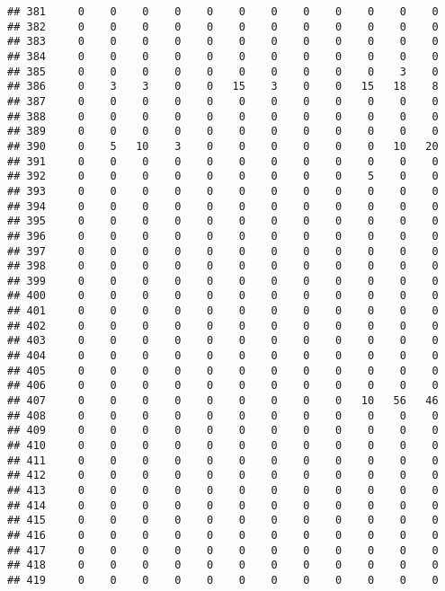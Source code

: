 \documentclass[]{article}
\begin{document}
\begin{verbatim}
## 381     0    0    0    0    0    0    0    0    0    0    0    0
## 382     0    0    0    0    0    0    0    0    0    0    0    0
## 383     0    0    0    0    0    0    0    0    0    0    0    0
## 384     0    0    0    0    0    0    0    0    0    0    0    0
## 385     0    0    0    0    0    0    0    0    0    0    3    0
## 386     0    3    3    0    0   15    3    0    0   15   18    8
## 387     0    0    0    0    0    0    0    0    0    0    0    0
## 388     0    0    0    0    0    0    0    0    0    0    0    0
## 389     0    0    0    0    0    0    0    0    0    0    0    0
## 390     0    5   10    3    0    0    0    0    0    0   10   20
## 391     0    0    0    0    0    0    0    0    0    0    0    0
## 392     0    0    0    0    0    0    0    0    0    5    0    0
## 393     0    0    0    0    0    0    0    0    0    0    0    0
## 394     0    0    0    0    0    0    0    0    0    0    0    0
## 395     0    0    0    0    0    0    0    0    0    0    0    0
## 396     0    0    0    0    0    0    0    0    0    0    0    0
## 397     0    0    0    0    0    0    0    0    0    0    0    0
## 398     0    0    0    0    0    0    0    0    0    0    0    0
## 399     0    0    0    0    0    0    0    0    0    0    0    0
## 400     0    0    0    0    0    0    0    0    0    0    0    0
## 401     0    0    0    0    0    0    0    0    0    0    0    0
## 402     0    0    0    0    0    0    0    0    0    0    0    0
## 403     0    0    0    0    0    0    0    0    0    0    0    0
## 404     0    0    0    0    0    0    0    0    0    0    0    0
## 405     0    0    0    0    0    0    0    0    0    0    0    0
## 406     0    0    0    0    0    0    0    0    0    0    0    0
## 407     0    0    0    0    0    0    0    0    0   10   56   46
## 408     0    0    0    0    0    0    0    0    0    0    0    0
## 409     0    0    0    0    0    0    0    0    0    0    0    0
## 410     0    0    0    0    0    0    0    0    0    0    0    0
## 411     0    0    0    0    0    0    0    0    0    0    0    0
## 412     0    0    0    0    0    0    0    0    0    0    0    0
## 413     0    0    0    0    0    0    0    0    0    0    0    0
## 414     0    0    0    0    0    0    0    0    0    0    0    0
## 415     0    0    0    0    0    0    0    0    0    0    0    0
## 416     0    0    0    0    0    0    0    0    0    0    0    0
## 417     0    0    0    0    0    0    0    0    0    0    0    0
## 418     0    0    0    0    0    0    0    0    0    0    0    0
## 419     0    0    0    0    0    0    0    0    0    0    0    0

\end{verbatim}
\end{document}
